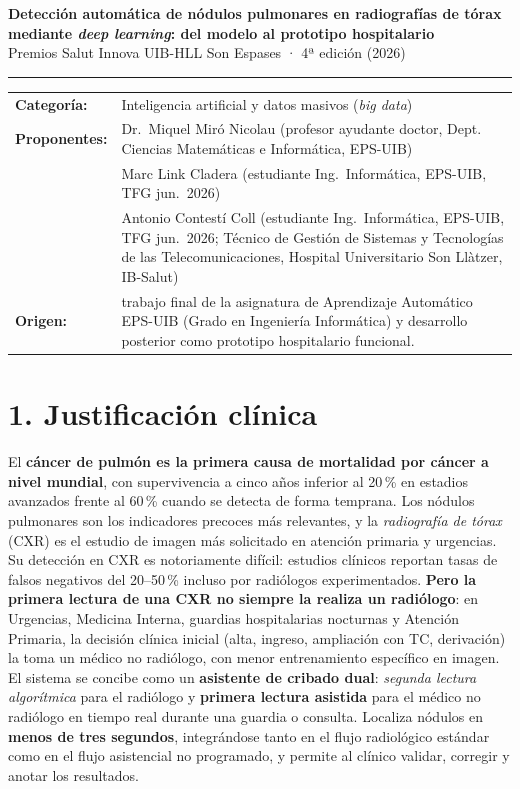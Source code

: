 \documentclass[11pt,a4paper]{article}
\begin{document}
\begin{center}
{\large\bfseries Detección automática de nódulos pulmonares en radiografías de tórax mediante \emph{deep learning}: del modelo al prototipo hospitalario}\\[2pt]
{\small Premios Salut Innova UIB-HLL Son Espases · 4ª edición (2026)}
\end{center}

\vspace{-4pt}
\hrule
\vspace{3pt}

\begin{tabularx}{\textwidth}{@{}lX@{}}
\textbf{Categoría:} & Inteligencia artificial y datos masivos (\emph{big data}) \\
\textbf{Proponentes:} & Dr.~Miquel Miró Nicolau (profesor ayudante doctor, Dept. Ciencias Matemáticas e Informática, EPS-UIB) \\
& Marc Link Cladera (estudiante Ing.\ Informática, EPS-UIB, TFG jun.\ 2026) \\
& Antonio Contestí Coll (estudiante Ing.\ Informática, EPS-UIB, TFG jun.\ 2026; Técnico de Gestión de Sistemas y Tecnologías de las Telecomunicaciones, Hospital Universitario Son Llàtzer, IB-Salut) \\
\textbf{Origen:} & trabajo final de la asignatura de Aprendizaje Automático EPS-UIB (Grado en Ingeniería Informática) y desarrollo posterior como prototipo hospitalario funcional. \\
\end{tabularx}

\vspace{1pt}

\section*{1. Justificación clínica}

El \textbf{cáncer de pulmón es la primera causa de mortalidad por cáncer a nivel mundial}, con supervivencia a cinco años inferior al 20\,\% en estadios avanzados frente al 60\,\% cuando se detecta de forma temprana. Los nódulos pulmonares son los indicadores precoces más relevantes, y la \emph{radiografía de tórax} (CXR) es el estudio de imagen más solicitado en atención primaria y urgencias. Su detección en CXR es notoriamente difícil: estudios clínicos reportan tasas de falsos negativos del 20--50\,\% incluso por radiólogos experimentados. \textbf{Pero la primera lectura de una CXR no siempre la realiza un radiólogo}: en Urgencias, Medicina Interna, guardias hospitalarias nocturnas y Atención Primaria, la decisión clínica inicial (alta, ingreso, ampliación con TC, derivación) la toma un médico no radiólogo, con menor entrenamiento específico en imagen. El sistema se concibe como un \textbf{asistente de cribado dual}: \emph{segunda lectura algorítmica} para el radiólogo y \textbf{primera lectura asistida} para el médico no radiólogo en tiempo real durante una guardia o consulta. Localiza nódulos en \textbf{menos de tres segundos}, integrándose tanto en el flujo radiológico estándar como en el flujo asistencial no programado, y permite al clínico validar, corregir y anotar los resultados.
\end{document}

